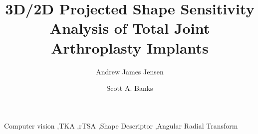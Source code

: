 \documentclass[preprint]{elsarticle}
\begin{document}
\linenumbers

\begin{frontmatter}
	\title{3D/2D Projected Shape Sensitivity Analysis of Total Joint Arthroplasty Implants}
	\author[a]{Andrew James Jensen}
	\author[a]{Scott A. Banks}
	
	\begin{keyword}
		Computer vision \sep TKA \sep rTSA \sep Shape Descriptor \sep Angular Radial Transform
	\end{keyword}
\end{frontmatter}









\end{document}
